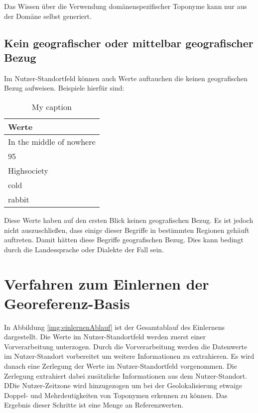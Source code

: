 			Das Wissen über die Verwendung domänenspezifischer Toponyme kann nur aus der Domäne selbst generiert.
		
		\subsection{Kein geografischer oder mittelbar geografischer Bezug} \label{sub:keinGeogOdMittelBarereBezug}

			Im Nutzer-Standortfeld können auch Werte auftauchen die keinen geografischen Bezug aufweisen.
			Beispiele hierfür sind:

			\begin{table}[h]
			\centering
			\caption{My caption}
			\label{my-label}
			\begin{tabular}{|l|}
			Werte                      	\\ \hline
			In the middle of nowhere   	\\ \hline
			95                         	\\ \hline
			Highsociety                	\\ \hline
			cold	                 	\\ \hline
			rabbit     					\\ \hline
			\end{tabular}
			\end{table}

			Diese Werte haben auf den ersten Blick keinen geografischen Bezug.
			Es ist jedoch nicht auszuschließen, dass einige dieser Begriffe in bestimmten Regionen gehäuft auftreten.
			Damit hätten diese Begriffe geografischen Bezug.
			Dies kann bedingt durch die Landessprache oder Dialekte der Fall sein.

	\section{Verfahren zum Einlernen der Georeferenz-Basis} \label{sec:VefrahrenZumEinlernen} 	
			
			In Abbildung \ref{img:einlernenAblauf} ist der Gesamtablauf des Einlernens dargestellt. 
			Die Werte im Nutzer-Standortfeld werden zuerst einer Vorverarbeitung unterzogen. 
			Durch die Vorverarbeitung werden die Datenwerte im Nutzer-Standort vorbereitet um weitere Informationen zu extrahieren.
			Es wird danach eine Zerlegung der Werte im Nutzer-Standortfeld vorgenommen.
			Die Zerlegung extrahiert dabei zusätzliche Informationen aus dem Nutzer-Standort.
			DDie Nutzer-Zeitzone wird hinzugezogen um bei der Geolokalisierung etwaige Doppel- und Mehrdeutigkeiten von Toponymen erkennen zu können.
			Das Ergebnis dieser Schritte ist eine Menge an Referenzwerten.

